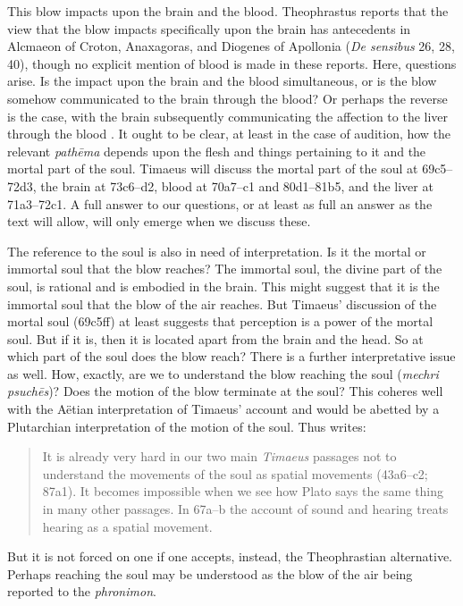 This blow impacts upon the brain and the blood. Theophrastus reports that the view that the blow impacts specifically upon the brain has antecedents in Alcmaeon of Croton, Anaxagoras, and Diogenes of Apollonia (\emph{De sensibus} 26, 28, 40), though no explicit mention of blood is made in these reports. Here, questions arise. Is the impact upon the brain and the blood simultaneous, or is the blow somehow communicated to the brain through the blood? Or perhaps the reverse is the case, with the brain subsequently communicating the affection to the liver through the blood \citep[477]{Taylor:1928qb}. It ought to be clear, at least in the case of audition, how the relevant \emph{pathēma} depends upon the flesh and things pertaining to it and the mortal part of the soul. Timaeus will discuss the mortal part of the soul at 69c5--72d3, the brain at 73c6--d2, blood at 70a7--c1 and 80d1--81b5, and the liver at 71a3--72c1. A full answer to our questions, or at least as full an answer as the text will allow, will only emerge when we discuss these.

The reference to the soul is also in need of interpretation. Is it the mortal or immortal soul that the blow reaches? The immortal soul, the divine part of the soul, is rational and is embodied in the brain. This might suggest that it is the immortal soul that the blow of the air reaches. But Timaeus' discussion of the mortal soul (69c5ff) at least suggests that perception is a power of the mortal soul. But if it is, then it is located apart from the brain and the head. So at which part of the soul does the blow reach? There is a further interpretative issue as well. How, exactly, are we to understand the blow reaching the soul (\emph{mechri psuchēs})? Does the motion of the blow terminate at the soul? This coheres well with the Aëtian interpretation of Timaeus' account and would be abetted by a Plutarchian interpretation of the motion of the soul. Thus \citet[154]{Sorabji:2003aa} writes:
\begin{quote}
	It is already very hard in our two main \emph{Timaeus} passages not to understand the movements of the soul as spatial movements (43a6--c2; 87a1). It becomes impossible when we see how Plato says the same thing in many other passages. In 67a--b the account of sound and hearing treats hearing as a spatial movement.
\end{quote}
But it is not forced on one if one accepts, instead, the Theophrastian alternative. Perhaps reaching the soul may be understood as the blow of the air being reported to the \emph{phronimon}. 

